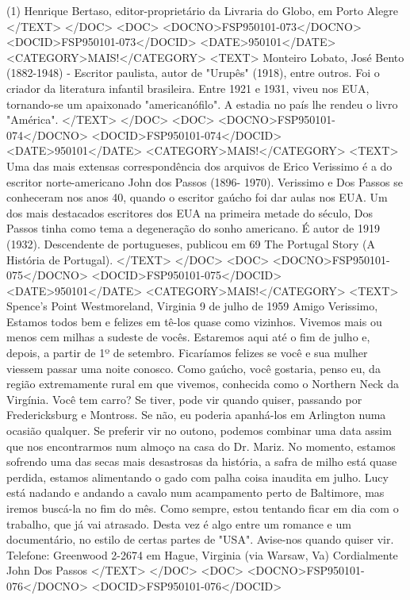 (1) Henrique Bertaso, editor-proprietário da Livraria do Globo, em Porto Alegre 
</TEXT>
</DOC>
<DOC>
<DOCNO>FSP950101-073</DOCNO>
<DOCID>FSP950101-073</DOCID>
<DATE>950101</DATE>
<CATEGORY>MAIS!</CATEGORY>
<TEXT>
Monteiro Lobato, José Bento (1882-1948) - Escritor paulista, autor de "Urupês" (1918), entre outros. Foi o criador da literatura infantil brasileira. Entre 1921 e 1931, viveu nos EUA, tornando-se um apaixonado "americanófilo". A estadia no país lhe rendeu o livro "América".
</TEXT>
</DOC>
<DOC>
<DOCNO>FSP950101-074</DOCNO>
<DOCID>FSP950101-074</DOCID>
<DATE>950101</DATE>
<CATEGORY>MAIS!</CATEGORY>
<TEXT>
 Uma das mais extensas correspondência dos arquivos de Erico Verissimo é a do escritor norte-americano John dos Passos (1896- 1970). Verissimo e Dos Passos se conheceram nos anos 40, quando o escritor gaúcho foi dar aulas nos EUA. Um dos mais destacados escritores dos EUA na primeira metade do século, Dos Passos tinha como tema a degeneração do  sonho americano. É autor de  1919 (1932). Descendente de portugueses, publicou em 69  The Portugal Story (A História de Portugal).
</TEXT>
</DOC>
<DOC>
<DOCNO>FSP950101-075</DOCNO>
<DOCID>FSP950101-075</DOCID>
<DATE>950101</DATE>
<CATEGORY>MAIS!</CATEGORY>
<TEXT>
Spence's Point
Westmoreland, Virginia
9 de julho de 1959
Amigo Verissimo,
Estamos todos bem e felizes em tê-los quase como vizinhos. Vivemos mais ou menos cem milhas a sudeste de vocês. Estaremos aqui até o fim de julho e, depois, a partir de 1º de setembro. Ficaríamos felizes se você e sua mulher viessem passar uma noite conosco. Como gaúcho, você gostaria, penso eu, da região extremamente rural em que vivemos, conhecida como o Northern Neck da Virgínia.
Você tem carro? Se tiver, pode vir quando quiser, passando por Fredericksburg e Montross. Se não, eu poderia apanhá-los em Arlington numa ocasião qualquer. Se preferir vir no outono, podemos combinar uma data assim que nos encontrarmos num almoço na casa do Dr. Mariz. No momento, estamos sofrendo uma das secas mais desastrosas da história, a safra de milho está quase perdida, estamos alimentando o gado com palha coisa inaudita em julho.
Lucy está nadando e andando a cavalo num acampamento perto de Baltimore, mas iremos buscá-la no fim do mês. Como sempre, estou tentando ficar em dia com o trabalho, que já vai atrasado. Desta vez é algo entre um romance e um documentário, no estilo de certas partes de "USA".
Avise-nos quando quiser vir.
Telefone: Greenwood 2-2674 em Hague, Virginia (via Warsaw, Va)
Cordialmente
John Dos Passos
</TEXT>
</DOC>
<DOC>
<DOCNO>FSP950101-076</DOCNO>
<DOCID>FSP950101-076</DOCID>
